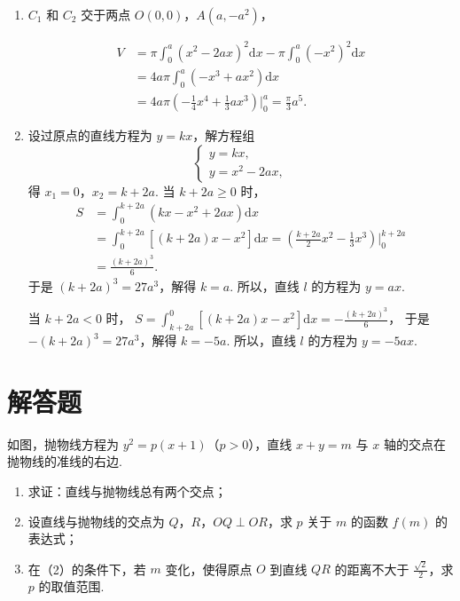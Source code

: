 \begin{solution}

\begin{enumerate}
\item \(C_1\) 和 \(C_2\) 交于两点 \(O(0,0)\)，\(A(a,-a^2)\)，

\[
\begin{aligned}
V&=\pi \int_0^a (x^2-2ax)^2 \mathrm{d}x-\pi \int_0^a (-x^2)^2 \mathrm{d}x \\
&=4a\pi \int_0^a (-x^3+ax^2) \mathrm{d}x \\
&=4a\pi \left(-\frac{1}{4}x^4+\frac{1}{3}ax^3\right)\Bigg|_0^a=\frac{\pi}{3}a^5.
\end{aligned}
\]
\item 设过原点的直线方程为 \(y=kx\)，解方程组
\[
\begin{cases}
y=kx,\\
y=x^2-2ax,
\end{cases}
\]
得 \(x_1=0\)，\(x_2=k+2a\). 当 \(k+2a \geqslant 0\) 时，
\[
\begin{aligned}
S&=\int_0^{k+2a} (kx-x^2+2ax) \mathrm{d}x \\
&=\int_0^{k+2a} \left[(k+2a)x-x^2\right] \mathrm{d}x
=\left(\frac{k+2a}{2}x^2-\frac{1}{3}x^3\right)\Bigg|_0^{k+2a} \\
&=\frac{(k+2a)^3}{6}.
\end{aligned}
\]
于是 \((k+2a)^3=27a^3\)，解得 \(k=a\). 所以，直线 \(l\) 的方程为 \(y=ax\).

当 \(k+2a<0\) 时，
\(S=\int_{k+2a}^0 \left[(k+2a)x-x^2\right] \mathrm{d}x=-\frac{(k+2a)^3}{6}\)，
于是 \(-(k+2a)^3=27a^3\)，解得 \(k=-5a\). 所以，直线 \(l\) 的方程为 \(y=-5ax\).
\end{enumerate}
\end{solution}

\section{解答题}

\begin{problem}
如图，抛物线方程为 \(y^2=p(x+1)\)（\(p>0\)），直线 \(x+y=m\) 与 \(x\) 轴的交点在抛物线的准线的右边.

\begin{enumerate}
\item 求证：直线与抛物线总有两个交点；
\item 设直线与抛物线的交点为 \(Q\)，\(R\)，\(OQ\perp OR\)，求 \(p\) 关于 \(m\) 的函数 \(f(m)\) 的表达式；
\item 在（2）的条件下，若 \(m\) 变化，使得原点 \(O\) 到直线 \(QR\) 的距离不大于 \(\frac{\sqrt{2}}{2}\)，求 \(p\) 的取值范围.
\end{enumerate}

\FloatBarrier
\end{problem}

